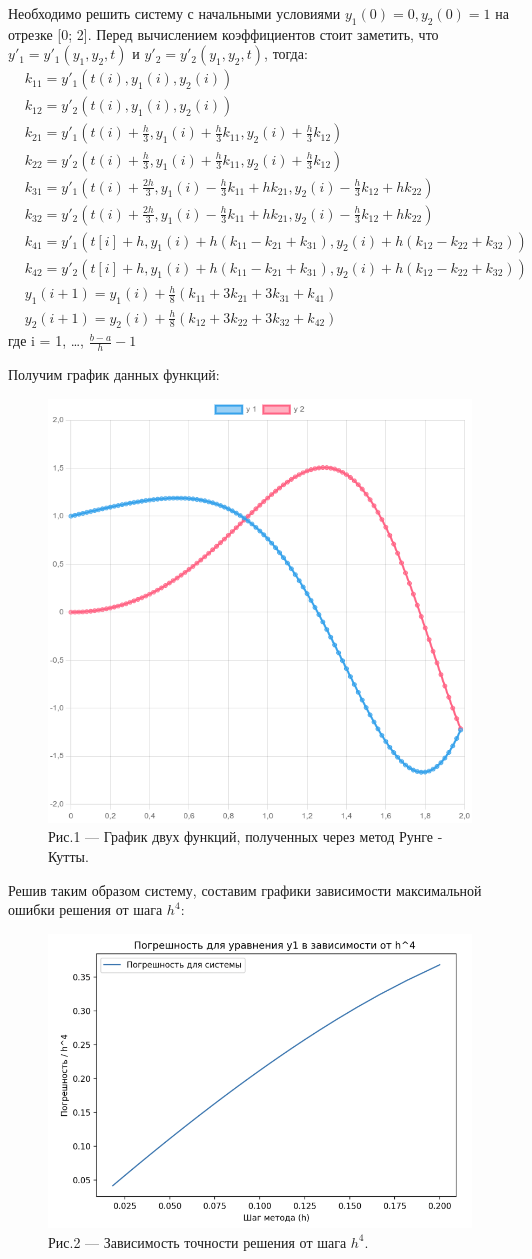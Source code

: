 \documentclass[a4paper,12pt]{article}
\begin{document}
Необходимо решить систему с начальными условиями $y_1(0) = 0, y_2(0) = 1$ на отрезке [0; 2].
Перед вычислением коэффициентов стоит заметить, что $y'_1 = y'_1(y_1, y_2, t)$ и $y'_2 = y'_2(y_1, y_2, t)$,
тогда:
\begin{align*}
    &k_{11} = y'_1(t(i), y_1(i), y_2(i))\\
    &k_{12} = y'_2(t(i), y_1(i), y_2(i))\\
    &k_{21} = y'_1(t(i) + \frac{h}{3}, y_1(i) + \frac{h}{3}k_{11}, y_2(i) + \frac{h}{3} k_{12})\\
    &k_{22} = y'_2(t(i) + \frac{h}{3}, y_1(i) + \frac{h}{3}k_{11}, y_2(i) + \frac{h}{3} k_{12})\\
    &k_{31} = y'_1(t(i) + \frac{2h}{3}, y_1(i) - \frac{h}{3}k_{11} + hk_{21}, y_2(i) - \frac{h}{3}k_{12} + hk_{22})\\
    &k_{32} = y'_2(t(i) + \frac{2h}{3}, y_1(i) - \frac{h}{3}k_{11} + hk_{21}, y_2(i) - \frac{h}{3}k_{12} + hk_{22})\\
    &k_{41} = y'_1(t[i] + h, y_1(i) + h (k_{11} - k_{21} + k_{31}), y_2(i) + h(k_{12} - k_{22} + k_{32}))\\
    &k_{42} = y'_2(t[i] + h, y_1(i) + h (k_{11} - k_{21} + k_{31}), y_2(i) + h(k_{12} - k_{22} + k_{32}))\\
    &y_1(i + 1) = y_1(i) + \frac{h}{8} (k_{11} + 3k_{21} + 3k_{31} + k_{41})\\
    &y_2(i + 1) = y_2(i) + \frac{h}{8} (k_{12} + 3k_{22} + 3k_{32} + k_{42})
\end{align*}
где i = 1, \dots, $\frac{b-a}{h} - 1$

Получим график данных функций:
\begin{figure}[h]
    \centering
    \includegraphics[width=0.31\linewidth]{pictures/testTaskResult.png}
    \captionsetup{labelformat=empty}
    \caption{Рис.1 --- График двух функций, полученных через метод Рунге - Кутты.}
\end{figure}

Решив таким образом систему, составим графики зависимости максимальной ошибки решения от шага $h^4$:
\begin{figure}[h]
    \centering
    \includegraphics[width=0.5\linewidth]{pictures/testTask.png}
    \captionsetup{labelformat=empty}
    \caption{Рис.2 --- Зависимость точности решения от шага $h^4$.}
\end{figure}
\end{document}
